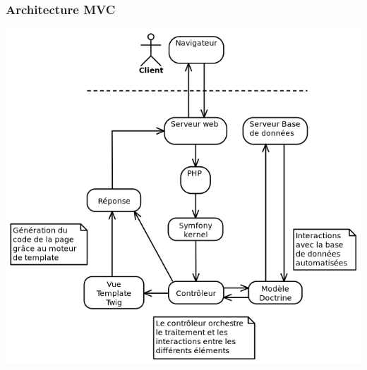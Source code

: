 \begin{frame}
    \frametitle{Architecture MVC}

    \centering
    \includegraphics[width=0.7\linewidth]{pictures/mvc.png}
\end{frame}
